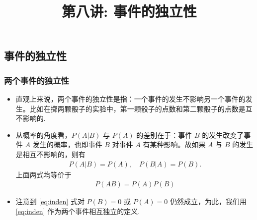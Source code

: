 \documentclass[Prob-All.tex]{subfiles}
\begin{document}
\title[概率论]{第八讲: 事件的独立性}
\date{}

{
	\begin{frame}
		\titlepage
	\end{frame}
}
\subsection{事件的独立性}

\begin{frame}
  \frametitle{两个事件的独立性}
  \begin{itemize}[<+-|alert@+>]
  \item 直观上来说，两个事件的独立性是指：一个事件的发生不影响另一个事件的发生。比如在掷两颗骰子的实验中，第一颗骰子的点数和第二颗骰子的点数是互不影响的.
  \item 从概率的角度看，$P (A|B)$ 与 $P (A)$ 的差别在于：事件 $B$ 的发生改变了事件 $A$ 发生的概率，也即事件 $B$ 对事件 $A$ 有某种影响。故如果 $A$ 与 $B$ 的发生是相互不影响的，则有 \pause
    \begin{eqnarray*}
      P(A|B)=P(A),\quad P(B|A)=P(B).
    \end{eqnarray*}
    \pause 上面两式均等价于
    \begin{eqnarray}\label{eq:inden}
      P(AB)=P(A)P(B)
    \end{eqnarray}
  \item 注意到 \eqref{eq:inden} 式对 $P (B)=0$ 或 $P (A)=0$ 仍然成立，为此，我们用 \eqref{eq:inden} 作为两个事件相互独立的定义.
  \end{itemize}
\end{frame}
\end{document}
